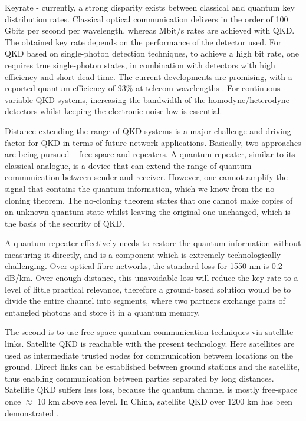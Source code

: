 Keyrate - currently, a strong disparity exists between classical and quantum key distribution rates. Classical optical communication delivers in the order of 100 Gbits per second per wavelength, whereas Mbit/s rates are achieved with QKD.
% 
 The obtained key rate depends on the performance of the detector used. For QKD based on single-photon detection techniques, to achieve a high bit rate, one requires true single-photon states, in combination with detectors with high efficiency and short dead time. The current developments are promising, with a reported quantum efficiency of $93\%$ at telecom wavelengths \cite{marsili2013detecting}.
% 
 For continuous-variable QKD systems, increasing the bandwidth of the homodyne/heterodyne detectors whilst keeping the electronic noise low is essential.


Distance-extending the range of QKD systems is a major challenge and driving factor for QKD in terms of future network applications. Basically, two approaches are being pursued -- free space and repeaters.  A quantum repeater, similar
to its classical analogue, is a device that can extend the range of quantum communication between sender and receiver. However, one cannot amplify the signal that contains the quantum information, which we know from the no-cloning theorem. The no-cloning theorem states that one cannot make copies of an unknown quantum state whilst leaving the original one unchanged, which is the basis of the security of QKD.

A quantum repeater effectively needs to restore the quantum information without measuring it directly, and is a component which is extremely technologically challenging. 
Over optical fibre networks, the standard loss for 1550 nm is 0.2 dB/km. Over enough distance, this unavoidable loss will reduce the key rate to a level of little practical relevance, therefore a ground-based solution would be to divide the entire channel into segments, where two partners exchange pairs of entangled photons and store it in a quantum memory\cite{PhysRevLett.81.5932,PhysRevA.59.169}.

The second is to use free space quantum communication techniques via satellite links. Satellite QKD is reachable with the present technology. Here satellites are used as intermediate trusted nodes for
communication between locations on the ground.
 Direct links can be
established between ground stations and the satellite, thus
enabling communication between parties separated by long distances. Satellite QKD suffers less loss, because the quantum channel is mostly free-space once $\approx$ 10 km above sea level.
% 
In China, satellite QKD over 1200 km has been demonstrated \cite{liao2017satellite}.


